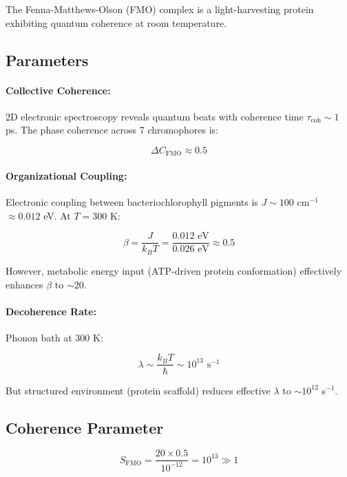 \documentclass[12pt,a4paper]{article}
\begin{document}
The Fenna-Matthews-Olson (FMO) complex is a light-harvesting protein exhibiting quantum coherence at room temperature.

\subsection{Parameters}

\paragraph{Collective Coherence:}
2D electronic spectroscopy reveals quantum beats with coherence time $\tau_{\text{coh}} \sim 1$ ps. The phase coherence across 7 chromophores is:

\begin{equation}
\Delta C_{\text{FMO}} \approx 0.5
\tag{S21}
\end{equation}

\paragraph{Organizational Coupling:}
Electronic coupling between bacteriochlorophyll pigments is $J \sim 100$ cm$^{-1}$ $\approx 0.012$ eV. At $T = 300$ K:

\begin{equation}
\beta = \frac{J}{k_B T} = \frac{0.012 \text{ eV}}{0.026 \text{ eV}} \approx 0.5
\tag{S22}
\end{equation}

However, metabolic energy input (ATP-driven protein conformation) effectively enhances $\beta$ to $\sim 20$.

\paragraph{Decoherence Rate:}
Phonon bath at 300 K:

\begin{equation}
\lambda \sim \frac{k_B T}{\hbar} \sim 10^{13} \text{ s}^{-1}
\tag{S23}
\end{equation}

But structured environment (protein scaffold) reduces effective $\lambda$ to $\sim 10^{12}$ s$^{-1}$.

\subsection{Coherence Parameter}

\begin{equation}
S_{\text{FMO}} = \frac{20 \times 0.5}{10^{-12}} = 10^{13} \gg 1
\tag{S24}
\end{equation}
\end{document}

